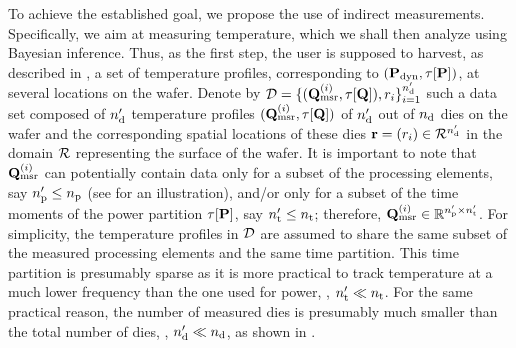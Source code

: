 To achieve the established goal, we propose the use of indirect measurements.
Specifically, we aim at measuring temperature, which we shall then analyze using Bayesian inference.
Thus, as the first step, the user is supposed to harvest, as described in , a set of temperature profiles, corresponding to $(\mathbf{P}_{\text{dyn}}, \tau[\mathbf{P}])$, at several locations on the wafer.
Denote by $\mathcal{D} = \{ (\mathbf{Q}^{(i)}_{\text{msr}}, \tau[\mathbf{Q}]), r_i \}_{i = 1}^{n_\text{d}'}$ such a data set composed of ${n_\text{d}'}$ temperature profiles $(\mathbf{Q}^{(i)}_{\text{msr}}, \tau[\mathbf{Q}])$ of ${n_\text{d}'}$ out of ${n_\text{d}}$ dies on the wafer and the corresponding spatial locations of these dies $\mathbf{r} = (r_i) \in \mathcal{R}^{n_\text{d}'}$ in the domain $\mathcal{R}$ representing the surface of the wafer.
It is important to note that $\mathbf{Q}^{(i)}_{\text{msr}}$ can potentially contain data only for a subset of the processing elements, say ${n_\text{p}'} \leq {n_\text{p}}$ (see  for an illustration), and/or only for a subset of the time moments of the power partition $\tau[\mathbf{P}]$, say ${n_\text{t}'} \leq {n_\text{t}}$; therefore, $\mathbf{Q}^{(i)}_{\text{msr}} \in \mathbb{R}^{{n_\text{p}'} \times {n_\text{t}'}}$.
For simplicity, the temperature profiles in $\mathcal{D}$ are assumed to share the same subset of the measured processing elements and the same time partition.
This time partition is presumably sparse as it is more practical to track temperature at a much lower frequency than the one used for power, \ie, ${n_\text{t}'} \ll {n_\text{t}}$.
For the same practical reason, the number of measured dies is presumably much smaller than the total number of dies, \ie, ${n_\text{d}'} \ll {n_\text{d}}$, as shown in .
